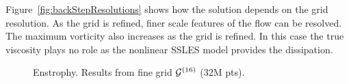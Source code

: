 \documentclass[11pt]{article}
\begin{document}
Figure~\ref{fig:backStepResolutions} shows how the solution depends on the grid resolution.
As the grid is refined, finer scale features of the flow can be resolved.
The maximum vorticity also increases as the grid is refined. 
In this case the true viscosity plays no role as the nonlinear SSLES model provides the dissipation.

{
\begin{figure}[hbt]
\newcommand{\figWidth}{11cm}
\newcommand{\trimfig}[2]{\trimFigb{#1}{#2}{0.0}{.0}{.1}{.4}}
\newcommand{\trimfiga}[2]{\trimFigb{#1}{#2}{0.0}{.0}{.2}{.4}}
\newcommand{\trimfigb}[2]{\trimFigb{#1}{#2}{0.0}{.0}{.05}{.35}}
\begin{center}\small
\caption{
Enstrophy. Results from fine grid ${\mathcal G}^{(16)}$ (32M pts).
}
\label{fig:backStepResults}
\end{center}
\end{figure}
}
\end{document}
